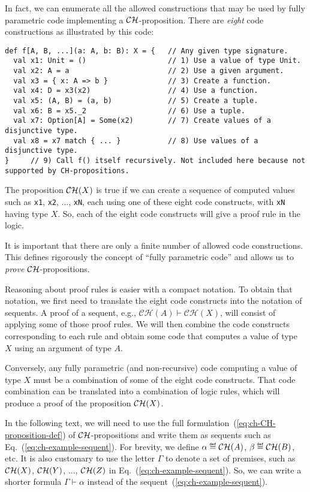 In fact, we can enumerate all the allowed constructions that may be
used by fully parametric code implementing a ${\cal CH}$-proposition.
There are \emph{eight} code constructions
as illustrated by this code:
\begin{lstlisting}
def f[A, B, ...](a: A, b: B): X = {   // Any given type signature.
  val x1: Unit = ()                   // 1) Use a value of type Unit.
  val x2: A = a                       // 2) Use a given argument.
  val x3 = { x: A => b }              // 3) Create a function.
  val x4: D = x3(x2)                  // 4) Use a function.
  val x5: (A, B) = (a, b)             // 5) Create a tuple.
  val x6: B = x5._2                   // 6) Use a tuple.
  val x7: Option[A] = Some(x2)        // 7) Create values of a disjunctive type.
  val x8 = x7 match { ... }           // 8) Use values of a disjunctive type.
}     // 9) Call f() itself recursively. Not included here because not supported by CH-propositions.
\end{lstlisting}
The proposition ${\cal CH}(X)$ is true if we can create a sequence
of computed values such as \lstinline!x1!, \lstinline!x2!, ...,
\lstinline!xN!, each using one of these eight code constructs, with
\lstinline!xN! having type $X$. So, each of the eight code constructs
will give a proof rule in the logic.

It is important that there are only a finite number of allowed code
constructions. This defines rigorously the concept of \textsf{``}fully parametric
code\textsf{''} and allows us to \emph{prove}
${\cal CH}$-propositions.

Reasoning about proof rules is easier with a compact notation. To
obtain that notation, we first need to translate the eight code constructs
into the notation of sequents. A proof of a sequent, e.g., $\mathcal{CH}(A)\vdash\mathcal{CH}(X)$,
will consist of applying some of those proof rules. We will then combine
the code constructs corresponding to each rule and obtain some code
that computes a value of type $X$ using an argument of type $A$. 

Conversely, any fully parametric (and non-recursive) code computing
a value of type $X$ must be a combination of some of the eight code
constructs. That code combination
can be translated into a combination of logic rules, which will produce
a proof of the proposition ${\cal CH}(X)$.

In the following text, we will need to use the full formulation~(\ref{eq:ch-CH-proposition-def})
of ${\cal CH}$-propositions and write them as sequents such as Eq.~(\ref{eq:ch-example-sequent}).
For brevity, we define $\alpha\triangleq{\cal CH}(A)$, $\beta\triangleq{\cal CH}(B)$,
etc. It is also customary to use the letter $\Gamma$ to denote a
set of premises, such as ${\cal CH}(X)$, ${\cal CH}(Y)$, ..., ${\cal CH}(Z)$
in Eq.~(\ref{eq:ch-example-sequent}). So, we can write a shorter
formula $\Gamma\vdash\alpha$ instead of the sequent~(\ref{eq:ch-example-sequent}).

